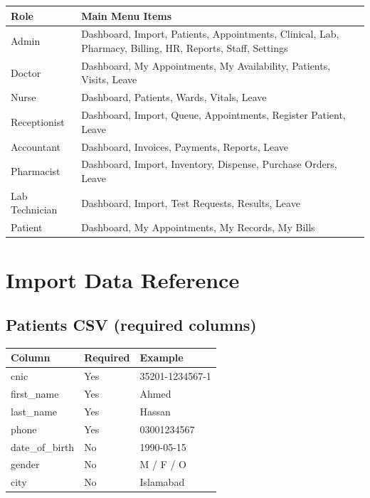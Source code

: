 \documentclass[11pt,a4paper]{report}
\begin{document}
\begin{longtable}{@{}p{3.5cm}p{9cm}@{}}
\toprule
\textbf{Role} & \textbf{Main Menu Items} \\
\midrule
\endhead
Admin &
Dashboard, Import, Patients, Appointments, Clinical, Lab, Pharmacy, Billing, HR, Reports, Staff, Settings \\
Doctor &
Dashboard, My Appointments, My Availability, Patients, Visits, Leave \\
Nurse &
Dashboard, Patients, Wards, Vitals, Leave \\
Receptionist &
Dashboard, Import, Queue, Appointments, Register Patient, Leave \\
Accountant &
Dashboard, Invoices, Payments, Reports, Leave \\
Pharmacist &
Dashboard, Import, Inventory, Dispense, Purchase Orders, Leave \\
Lab Technician &
Dashboard, Import, Test Requests, Results, Leave \\
Patient &
Dashboard, My Appointments, My Records, My Bills \\
\bottomrule
\end{longtable}

\chapter{Import Data Reference}

\section{Patients CSV (required columns)}

\begin{table}[h]
\centering
\small
\begin{tabular}{@{}lll@{}}
\toprule
\textbf{Column} & \textbf{Required} & \textbf{Example} \\
\midrule
cnic & Yes & 35201-1234567-1 \\
first\_name & Yes & Ahmed \\
last\_name & Yes & Hassan \\
phone & Yes & 03001234567 \\
date\_of\_birth & No & 1990-05-15 \\
gender & No & M / F / O \\
city & No & Islamabad \\
\bottomrule
\end{tabular}
\end{table}
\end{document}
